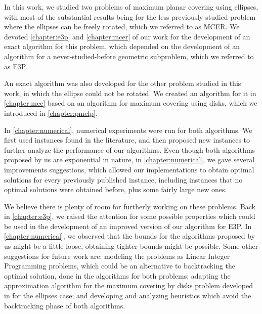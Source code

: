 In this work, we studied two problems of maximum planar covering using ellipses, with most of the substantial results being for the less previously-studied problem where the ellipses can be freely rotated, which we referred to as MCER. We devoted \autoref{chapter:e3p} and \autoref{chapter:mcer} of our work for the development of an exact algorithm for this problem, which depended on the development of an algorithm for a never-studied-before geometric subproblem, which we referred to as E3P. 

An exact algorithm was also developed for the other problem studied in this work, in which the ellipse could not be rotated. We created an algorithm for it in \autoref{chapter:mce} based on an algorithm for maximum covering using disks, which we introduced in \autoref{chapter:pmclp}.

In \autoref{chapter:numerical}, numerical experiments were run for both algorithms. We first used instances found in the literature, and then proposed new instances to further analyze the performance of our algorithms.
Even though both algorithms proposed by us are exponential in nature, 
in \autoref{chapter:numerical}, we gave several improvements suggestions, which allowed our implementations to obtain optimal solutions for every previously published instance, including instances that no optimal solutions were obtained before, plus some fairly large new ones.

We believe there is plenty of room for furtherly working on these problems.
Back in \autoref{chapter:e3p}, we raised the attention for some possible properties which could be used in the development of an improved version of our algorithm for E3P.
In \autoref{chapter:numerical}, we observed that the bounds for the algorithms proposed by us might be a little loose, obtaining tighter bounds might be possible.
Some other suggestions for future work are: modeling the problems as Linear Integer Programming problems, which could be an alternative to backtracking the optimal solution, done in the algorithms for both problems; adapting the  approximation algorithm for the maximum covering by disks problem developed in  for the ellipses case; and developing and analyzing heuristics which avoid the backtracking phase of both algorithms.